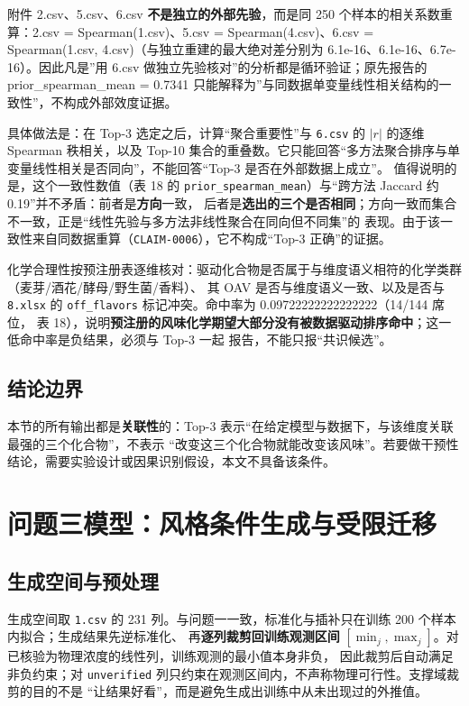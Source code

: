 \documentclass[
  a4paper,12pt]{article}
\begin{document}
附件 2.csv、5.csv、6.csv \textbf{不是独立的外部先验}，而是同 250
个样本的相关系数重算：2.csv = Spearman(1.csv)、5.csv =
Spearman(4.csv)、6.csv = Spearman(1.csv,
4.csv)（与独立重建的最大绝对差分别为
6.1e-16、6.1e-16、6.7e-16）。因此凡是''用 6.csv
做独立先验核对''的分析都是循环验证；原先报告的 prior\_spearman\_mean =
0.7341
只能解释为''与同数据单变量线性相关结构的一致性''，不构成外部效度证据。

具体做法是：在 Top-3 选定之后，计算``聚合重要性''与 \texttt{6.csv} 的
\(|r|\) 的逐维 Spearman 秩相关，以及 Top-10
集合的重叠数。它只能回答``多方法聚合排序与单变量线性相关是否同向''，不能回答``Top-3
是否在外部数据上成立''。 值得说明的是，这个一致性数值（表 18 的
\texttt{prior\_spearman\_mean}）与``跨方法 Jaccard 约
0.19''并不矛盾：前者是\textbf{方向}一致，
后者是\textbf{选出的三个是否相同}；方向一致而集合不一致，正是``线性先验与多方法非线性聚合在同向但不同集''的
表现。由于该一致性来自同数据重算（\texttt{CLAIM-0006}），它不构成``Top-3
正确''的证据。

化学合理性按预注册表逐维核对：驱动化合物是否属于与维度语义相符的化学类群（麦芽/酒花/酵母/野生菌/香料）、
其 OAV 是否与维度语义一致、以及是否与 \texttt{8.xlsx} 的
\texttt{off\_flavors} 标记冲突。命中率为 0.09722222222222222（14/144
席位， 表
18），说明\textbf{预注册的风味化学期望大部分没有被数据驱动排序命中}；这一低命中率是负结果，必须与
Top-3 一起 报告，不能只报``共识候选''。

\subsection{结论边界}\label{ux7ed3ux8bbaux8fb9ux754c}

本节的所有输出都是\textbf{关联性}的：Top-3
表示``在给定模型与数据下，与该维度关联最强的三个化合物''，不表示
``改变这三个化合物就能改变该风味''。若要做干预性结论，需要实验设计或因果识别假设，本文不具备该条件。

\section{问题三模型：风格条件生成与受限迁移}\label{ux95eeux9898ux4e09ux6a21ux578bux98ceux683cux6761ux4ef6ux751fux6210ux4e0eux53d7ux9650ux8fc1ux79fb}

\subsection{生成空间与预处理}\label{ux751fux6210ux7a7aux95f4ux4e0eux9884ux5904ux7406}

生成空间取 \texttt{1.csv} 的 231 列。与问题一一致，标准化与插补只在训练
200 个样本内拟合；生成结果先逆标准化、 再\textbf{逐列裁剪回训练观测区间}
\([\min_j,\max_j]\)。对已核验为物理浓度的线性列，训练观测的最小值本身非负，
因此裁剪后自动满足非负约束；对 \texttt{unverified}
列只约束在观测区间内，不声称物理可行性。支撑域裁剪的目的不是
``让结果好看''，而是避免生成出训练中从未出现过的外推值。
\end{document}
